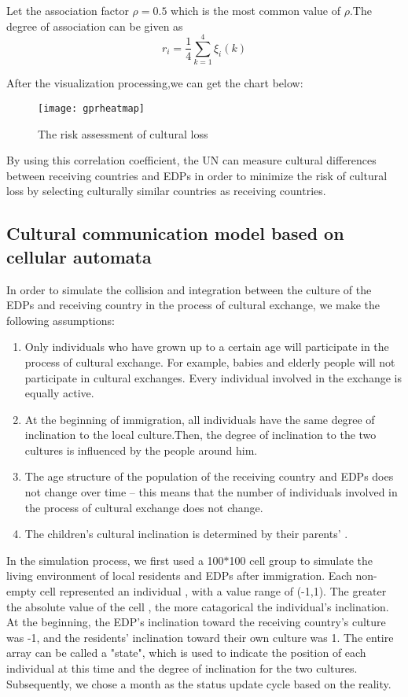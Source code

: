 \documentclass{mcmthesis}
\begin{document}
Let the association factor $\rho=0.5$ which is the most common value of $\rho$.The degree of association can be given as
\begin{equation}
r_{i}=\frac{1}{4}\sum_{k=1}^{4}\xi_{i}(k)
\end{equation}

After the visualization processing,we can get the chart below:
\begin{figure}[h]%
	\small
	\centering
	\texttt{[image: gprheatmap]}%
	\caption{The risk assessment of cultural loss}\label{fig:7}%
\end{figure}

By using this correlation coefficient, the UN can measure cultural differences between receiving countries and EDPs in order to minimize the risk of cultural loss by selecting culturally similar countries as receiving countries.



\subsection{Cultural communication model based on cellular automata}
In order to simulate the collision and integration between the culture of the EDPs and receiving country in the process of cultural exchange, we make the following assumptions:
\begin{enumerate}
\item Only individuals who have grown up to a certain age will participate in the process of cultural exchange. For example, babies and elderly people will not participate in cultural exchanges. Every individual involved in the exchange is equally active.
\item At the beginning of immigration, all individuals have the same degree of inclination to the local culture.Then, the degree of inclination to the two cultures is influenced by the people around him.
\item The age structure of the population of the receiving country and EDPs does not change over time -- this means that the number of individuals involved in the process of cultural exchange does not change.
\item The children's cultural inclination is determined by their parents' .
\end{enumerate}


In the simulation process, we first used a 100$*$100 cell group to simulate the living environment of local residents and EDPs after immigration. Each non-empty cell represented an individual , with a value range of (-1,1). The greater the absolute value of the cell , the more catagorical the individual's inclination. At the beginning, the EDP's inclination toward the receiving country's culture was -1, and the residents' inclination toward their own culture was 1. The entire array can be called a "state", which is used to indicate the position of each individual at this time and the degree of inclination for the two cultures. Subsequently, we chose a month as the status update cycle based on the reality.
\end{document}
